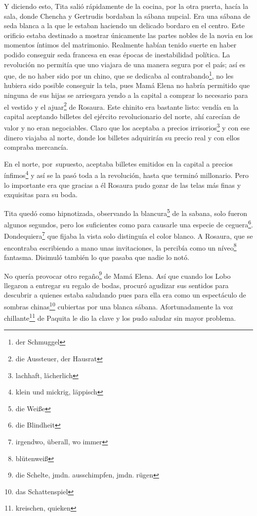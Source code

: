 Y diciendo esto, Tita salió rápidamente de la cocina, por la otra
puerta, hacía la sala, donde Chencha y Gertrudis bordaban la sábana
nupcial. Era una sábana de seda blanca a la que le estaban haciendo un
delicado bordaro en el centro. Este orificio estaba destinado a mostrar
únicamente las partes nobles de la novia en los momentos íntimos del
matrimonio. Realmente habían tenido suerte en haber podido conseguir
seda francesa en esas épocas de inestabilidad política. La revolución no
permitía que uno viajara de una manera segura por el país; así es que,
de no haber sido por un chino, que se dedicaba al contrabando\footnote{der Schmuggel}, no les
hubiera sido posible conseguir la tela, pues Mamá Elena no habría
permitido que ninguna de sus hijas se arriesgara yendo a la capital a
comprar lo necesario para el vestido y el ajuar\footnote{die Aussteuer, der Hausrat}
de Rosaura. Este chinito era bastante listo: vendía en la capital
aceptando billetes del ejército revolucionario del norte, ahí carecían
de valor y no eran negociables. Claro que los aceptaba a precios irrisorios\footnote{lachhaft, lächerlich} y con ese dinero
viajaba al norte, donde los billetes adquirirán su precio real y con
ellos compraba mercancía.

En el norte, por~supuesto, aceptaba billetes emitidos en la
capital a precios ínfimos\footnote{klein und mickrig, läppisch}
y así se la pasó toda a la revolución, hasta
que terminó millonario. Pero lo importante era que gracias a él Rosaura
pudo gozar de las telas más finas y exquisitas para su boda.

Tita quedó como hipnotizada, observando la blancura\footnote{die Weiße}
de la sabana, solo fueron algunos segundos, pero los suficientes como
para causarle una especie de ceguera\footnote{die Blindheit}. Dondequiera\footnote{irgendwo, überall, wo immer} que fijaba la
vista solo distinguía el color blanco. A Rosaura, que se encontraba
escribiendo a mano unas invitaciones, la percibía como un níveo\footnote{blütenweiß}
fantasma.  Disimuló también lo que pasaba que nadie lo notó.

No quería provocar otro regaño\footnote{die Schelte, jmdn. ausschimpfen, jmdn. rügen}
de Mamá Elena. Así que cuando los Lobo llegaron a entregar su regalo de bodas,
procuró agudizar sus sentidos
para descubrir a quienes estaba saludando pues para ella era como un espectáculo de sombras chinas\footnote{das Schattenspiel}
cubiertas por una blanca sábana.
Afortunadamente la voz chillante\footnote{kreischen, quieken} de Paquita
le dio la clave y los pudo saludar sin mayor problema.

